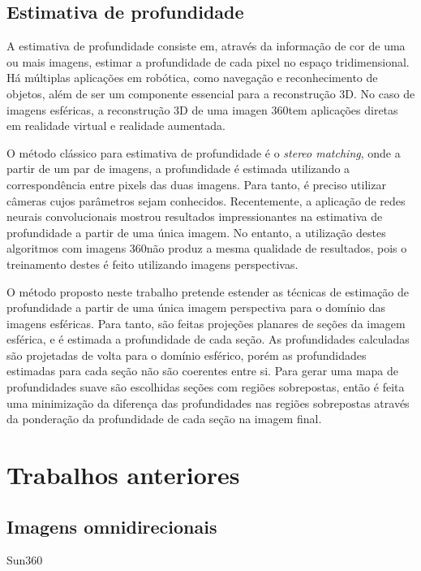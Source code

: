 \documentclass[cic,tc]{iiufrgs}
\begin{document}
\section{Estimativa de profundidade}

A estimativa de profundidade consiste em, através da informação de cor de uma ou mais imagens, estimar a profundidade de cada pixel no espaço tridimensional. Há múltiplas aplicações em robótica, como navegação e reconhecimento de objetos, além de ser um componente essencial para a reconstrução 3D. No caso de imagens esféricas, a reconstrução 3D de uma imagen 360\degree tem aplicações diretas em realidade virtual e realidade aumentada.

O método clássico para estimativa de profundidade é o \textit{stereo matching}, onde a partir de um par de imagens, a profundidade é estimada utilizando a correspondência entre pixels das duas imagens. Para tanto, é preciso utilizar câmeras cujos parâmetros sejam conhecidos. Recentemente, a aplicação de redes neurais convolucionais mostrou resultados impressionantes na estimativa de profundidade a partir de uma única imagem. No entanto, a utilização destes algoritmos com imagens 360\degree não produz a mesma qualidade de resultados, pois o treinamento destes é feito utilizando imagens perspectivas.

O método proposto neste trabalho pretende estender as técnicas de estimação de profundidade a partir de uma única imagem perspectiva para o domínio das imagens esféricas. Para tanto, são feitas projeções planares de seções da imagem esférica, e é estimada a profundidade de cada seção. As profundidades calculadas são projetadas de volta para o domínio esférico, porém as profundidades estimadas para cada seção não são coerentes entre si. Para gerar uma mapa de profundidades suave são escolhidas seções com regiões sobrepostas, então é feita uma minimização da diferença das profundidades nas regiões sobrepostas através da ponderação da profundidade de cada seção na imagem final.



\chapter{Trabalhos anteriores}

\section{Imagens omnidirecionais}
Sun360
\end{document}
